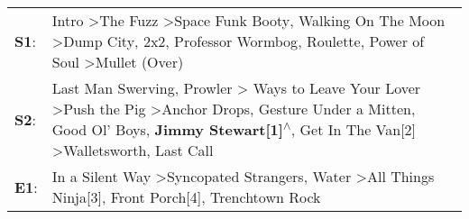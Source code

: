 \begin{supertabular}{p{0.03\textwidth}p{0.92\textwidth}}
 \textbf{S1}:  &                                                                                                     Intro\textsuperscript{} \textgreater \enspace The Fuzz\textsuperscript{} \textgreater \enspace Space Funk Booty\textsuperscript{}, \enspace Walking On The Moon\textsuperscript{} \textgreater \enspace Dump City\textsuperscript{}, \enspace 2x2\textsuperscript{}, \enspace Professor Wormbog\textsuperscript{}, \enspace Roulette\textsuperscript{}, \enspace Power of Soul\textsuperscript{} \textgreater \enspace Mullet (Over)\textsuperscript{}  \enspace  \\
 \textbf{S2}:  &  Last Man Swerving\textsuperscript{}, \enspace Prowler\textsuperscript{} \textgreater {} Ways to Leave Your Lover\textsuperscript{} \textgreater \enspace Push the Pig\textsuperscript{} \textgreater \enspace Anchor Drops\textsuperscript{}, \enspace Gesture Under a Mitten\textsuperscript{}, \enspace Good Ol' Boys\textsuperscript{}, \enspace \textbf{Jimmy Stewart[1]\textsuperscript{$\wedge$}}, \enspace Get In The Van[2]\textsuperscript{} \textgreater \enspace Walletsworth\textsuperscript{}, \enspace Last Call\textsuperscript{}  \enspace  \\
 \textbf{E1}:  &                                                                                                                                                                                                                                                                        In a Silent Way\textsuperscript{} \textgreater \enspace Syncopated Strangers\textsuperscript{}, \enspace Water\textsuperscript{} \textgreater \enspace All Things Ninja[3]\textsuperscript{}, \enspace Front Porch[4]\textsuperscript{}, \enspace Trenchtown Rock\textsuperscript{}  \enspace  \\
\end{supertabular}
